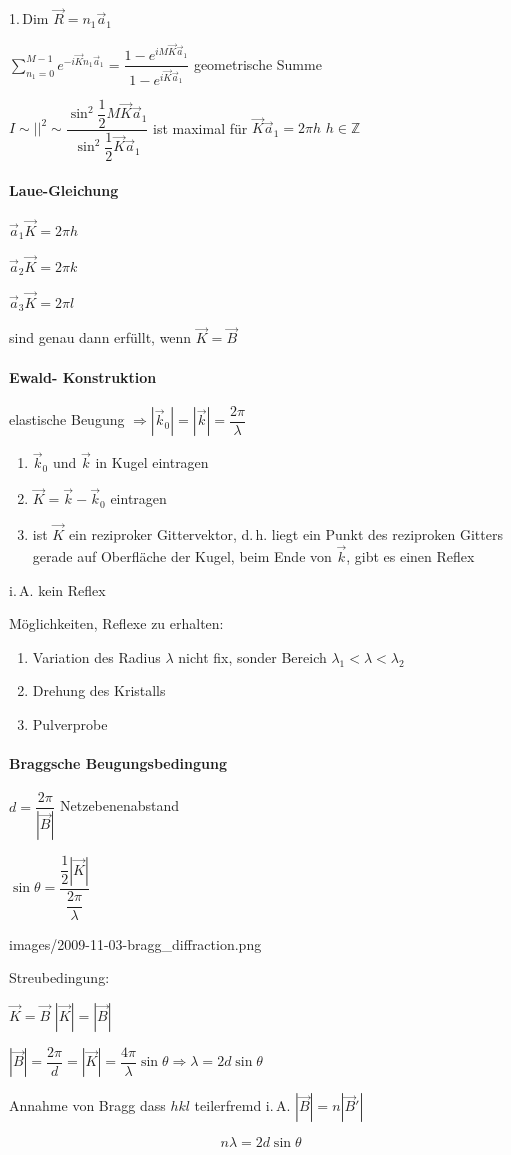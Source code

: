 1.\,Dim $\vec{R}=n_{1}\vec{a}_{1}$ 

$\sum_{n_{1}=0}^{M-1}e^{-i\vec{K}n_{1}\vec{a}_{1}}=\dfrac{1-e^{iM\vec{K}\vec{a}_{1}}}{1-e^{i\vec{K}\vec{a}_{1}}}$
geometrische Summe

$I\sim\left|\right|^{2}\sim\dfrac{\sin^{2}\dfrac{1}{2}M\vec{K}\vec{a}_{1}}{\sin^{2}\dfrac{1}{2}\vec{K}\vec{a}_{1}}$
ist maximal f\"ur $\vec{K}\vec{a}_{1}=2\pi h$ $h\in\mathbb{Z}$


\paragraph{Laue-Gleichung}

$\vec{a}_{1}\vec{K}=2\pi h$ 

$\vec{a}_{2}\vec{K}=2\pi k$

$\vec{a}_{3}\vec{K}=2\pi l$ 

sind genau dann erf\"ullt, wenn $\vec{K}=\vec{B}$ 


\paragraph{Ewald- Konstruktion}

elastische Beugung $\Rightarrow\left|\vec{k}_{0}\right|=\left|\vec{k}\right|=\dfrac{2\pi}{\lambda}$
\begin{enumerate}
\item $\vec{k}_{0}$ und $\vec{k}$ in Kugel eintragen
\item $\vec{K}=\vec{k}-\vec{k}_{0}$ eintragen
\item ist $\vec{K}$ ein reziproker Gittervektor, d.\,h. liegt ein Punkt
des reziproken Gitters gerade auf Oberfl\"ache der Kugel, beim Ende
von $\vec{k}$, gibt es einen Reflex
\end{enumerate}
i.\,A. kein Reflex

M\"oglichkeiten, Reflexe zu erhalten:
\begin{enumerate}
\item Variation des Radius $\lambda$ nicht fix, sonder Bereich $\lambda_{1}<\lambda<\lambda_{2}$
\item Drehung des Kristalls
\item Pulverprobe
\end{enumerate}

\paragraph{Braggsche Beugungsbedingung}

$d=\dfrac{2\pi}{\left|\vec{B}\right|}$ Netzebenenabstand

$\sin\theta=\dfrac{\dfrac{1}{2}\left|\vec{K}\right|}{\dfrac{2\pi}{\lambda}}$

images/2009-11-03-bragg\_diffraction.png

Streubedingung: 

$\vec{K}=\vec{B}$ $\left|\vec{K}\right|=\left|\vec{B}\right|$

$\left|\vec{B}\right|=\dfrac{2\pi}{d}=\left|\vec{K}\right|=\dfrac{4\pi}{\lambda}\sin\theta\Rightarrow\lambda=2d\sin\theta$ 

Annahme von Bragg dass $hkl$ teilerfremd i.\,A. $\left|\vec{B}\right|=n\left|\vec{B}'\right|$

\[
n\lambda=2d\sin\theta\]
